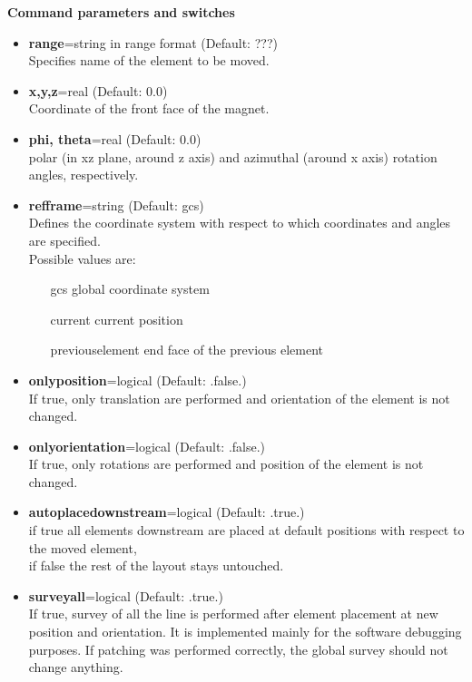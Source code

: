 {\bf  Command parameters and switches }
\begin{itemize}
   \item {\bf range}=string in range format (Default: ???)\\
     Specifies name of the element to be moved.   

   \item {\bf x,y,z}=real (Default: 0.0)\\
     Coordinate of the front face of the magnet.   

   \item {\bf phi, theta}=real (Default: 0.0)\\
     polar (in xz plane, around z axis) and azimuthal (around x axis)
     rotation angles, respectively.   
     
   \item {\bf refframe}=string (Default: gcs)\\
     Defines the coordinate system with respect to which coordinates and
     angles are specified. \\
     Possible values are:       
     \begin{itemize}
        \item[gcs]  global coordinate system 
        \item[current]   current position
        \item[previouselement]  end face of the previous element 
     \end{itemize}

   \item {\bf onlyposition}=logical (Default: .false.)\\
     If true, only translation are performed and orientation of the
     element is not changed.    

   \item {\bf onlyorientation}=logical (Default: .false.)\\
     If true, only rotations are performed and position of the element
     is not changed.    

   \item {\bf autoplacedownstream}=logical (Default: .true.)\\
     if true all elements downstream are placed at default positions
     with respect to the moved element, \\
     if false the rest of the layout stays untouched.    

   \item {\bf surveyall}=logical  (Default: .true.)\\
     If true, survey of all the line is performed after element
     placement at new position and orientation. It is implemented
     mainly for the software debugging purposes. If patching was
     performed correctly, the global survey should not change anything.     
\end{itemize}

